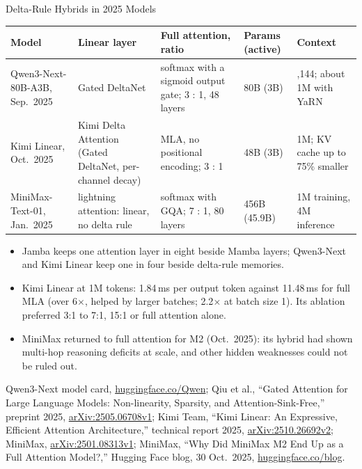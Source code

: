 \begin{frame}{Delta-Rule Hybrids in 2025 Models}
  \centering
  {\scriptsize
  \setlength{\tabcolsep}{4pt}
  \begin{tabular}{>{\raggedright\arraybackslash}p{2.0cm} >{\raggedright\arraybackslash}p{3.2cm} >{\raggedright\arraybackslash}p{3.1cm} >{\raggedright\arraybackslash}p{1.7cm} >{\raggedright\arraybackslash}p{2.3cm}}
    \toprule
    \textbf{Model} & \textbf{Linear layer} & \textbf{Full attention, ratio} & \textbf{Params (active)} & \textbf{Context} \\
    \midrule
    Qwen3-Next-80B-A3B, Sep.\ 2025 & Gated DeltaNet & softmax with a sigmoid output gate; 3 : 1, 48 layers & 80B (3B) & 262,144; about 1M with YaRN \\
    \addlinespace[0.2em]
    Kimi Linear, Oct.\ 2025 & Kimi Delta Attention (Gated DeltaNet, per-channel decay) & MLA, no positional encoding; 3 : 1 & 48B (3B) & 1M; KV cache up to 75\% smaller \\
    \addlinespace[0.2em]
    MiniMax-Text-01, Jan.\ 2025 & lightning attention: linear, no delta rule & softmax with GQA; 7 : 1, 80 layers & 456B (45.9B) & 1M training, 4M inference \\
    \bottomrule
  \end{tabular}\par}
  \raggedright
  \vspace{-0.3em}
  \begin{itemize}\footnotesize\itemsep0.1em
    \item[\textcolor{red}{$\blacktriangleright$}] Jamba keeps one attention layer in eight beside Mamba layers; Qwen3-Next and Kimi Linear keep one in four beside delta-rule memories.
    \item[\textcolor{red}{$\blacktriangleright$}] Kimi Linear at 1M tokens: 1.84\,ms per output token against 11.48\,ms for full MLA (over 6$\times$, helped by larger batches; 2.2$\times$ at batch size 1). Its ablation preferred 3:1 to 7:1, 15:1 or full attention alone.
    \item[\textcolor{red}{$\blacktriangleright$}] MiniMax returned to full attention for M2 (Oct.\ 2025): its hybrid had shown multi-hop reasoning deficits at scale, and other hidden weaknesses could not be ruled out.
  \end{itemize}
  {\scriptsize Qwen3-Next model card, \href{https://huggingface.co/Qwen/Qwen3-Next-80B-A3B-Instruct}{huggingface.co/Qwen}; Qiu et al., ``Gated Attention for Large Language Models: Non-linearity, Sparsity, and Attention-Sink-Free,'' preprint 2025, \href{https://arxiv.org/abs/2505.06708v1}{arXiv:2505.06708v1}; Kimi Team, ``Kimi Linear: An Expressive, Efficient Attention Architecture,'' technical report 2025, \href{https://arxiv.org/abs/2510.26692v2}{arXiv:2510.26692v2}; MiniMax, \href{https://arxiv.org/abs/2501.08313v1}{arXiv:2501.08313v1}; MiniMax, ``Why Did MiniMax M2 End Up as a Full Attention Model?,'' Hugging Face blog, 30 Oct.\ 2025, \href{https://huggingface.co/blog/MiniMax-AI/why-did-m2-end-up-as-a-full-attention-model}{huggingface.co/blog}.}
\end{frame}
